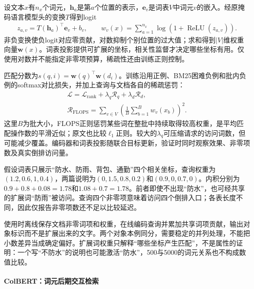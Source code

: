 设文本$x$有$n_x$个词元，$\bm h_a$是第$a$个位置的表示，$\bm e_v$是词表$V$中词元$v$的嵌入。经原掩码语言模型头的变换$T$得到logit
\begin{equation}
 \begin{split}
 z_{a,v}=T(\bm h_a)^\top\bm e_v+b_v,\qquad
 w_v(x)=\sum_{a=1}^{n_x}\log(1+\operatorname{ReLU}(z_{a,v})).
 \end{split}
 \label{eq:rs-search-splade-representation}
\end{equation}
非负变换使负logit对应零贡献，对数抑制个别位置的过大值；求和得到$\lvert V\rvert$维权重向量$\bm w(x)$。词表投影提供可扩展的坐标，相关性监督才决定哪些坐标有用。仅使用对数并不能指定非零项预算，稀疏性还由训练正则控制。

匹配分数为$s(q,i)=\bm w(q)^\top\bm w(d_i)$。训练沿用正例、BM25困难负例和批内负例的softmax对比损失，并加上查询与文档各自的稀疏惩罚：
\begin{equation}
 \begin{split}
 \mathcal L=\mathcal L_{\mathrm{rank}}+
 \lambda_q\mathcal R_q+\lambda_d\mathcal R_d,\qquad\\
 \mathcal R_{\mathrm{FLOPS}}
 =\sum_{v\in V}\left(\frac1B\sum_{b=1}^{B}w_v(x_b)\right)^2 .
 \end{split}
 \label{eq:rs-search-splade-objective}
\end{equation}
这里$B$为批大小，FLOPS正则惩罚某些词在整批中持续取得较高权重，是平均匹配操作数的平滑近似；原文也比较$\ell_1$正则。较大的$\lambda_q$可压缩请求的访问词数，但可能减少覆盖。编码器和词表投影随联合目标更新，验证时同时观察效果、非零项数及真实倒排访问量。

假设词表只展示“防水、防雨、背包、通勤”四个相关坐标，查询权重为$(1.2,0.6,1,0.4)$，两篇说明为$(0,1.5,0.8,0.2)$和$(0.9,0,0.7,0)$。内积分别为$0.9+0.8+0.08=1.78$和$1.08+0.7=1.78$。前者即使不出现“防水”，也可经共享的扩展词“防雨”被访问。查询四个非零项意味着访问四个倒排入口；各表长度不同，因此仅报告非零项数还不足以比较延迟。

使用时离线保存文档非零词项和权重，在线编码查询并累加共享词项贡献，输出对象标识而不是扩展出来的文字。两个对象本例同分，需要稳定的并列处理，不能把小数差异当成确定偏好。扩展词权重只解释“哪些坐标产生匹配”，不是属性的证明：一个写“不防水”的说明也可能激活“防水”，500与5000的词元关系也不构成数值比较。

\Needspace{100mm}
\paragraph{ColBERT：词元后期交互检索}
\label{sec:rs-search-colbert}

